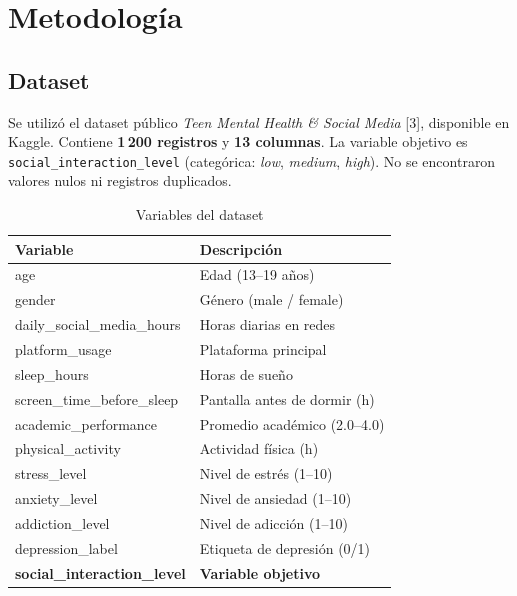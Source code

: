 \documentclass[11pt,twocolumn]{article}
\begin{document}
\section{Metodolog\'ia}

\subsection{Dataset}

Se utiliz\'o el dataset p\'ublico \textit{Teen Mental Health \& Social Media}
[3], disponible en Kaggle. Contiene \textbf{1\,200 registros} y
\textbf{13 columnas}. La variable objetivo es
\texttt{social\_interaction\_level} (categ\'orica: \textit{low},
\textit{medium}, \textit{high}). No se encontraron valores nulos ni
registros duplicados.

\begin{table}[H]
\centering
\caption{Variables del dataset}
\small
\begin{tabularx}{\linewidth}{lX}
\toprule
\textbf{Variable} & \textbf{Descripci\'on} \\
\midrule
\rowcolor{lightrow} age & Edad (13--19 a\~nos) \\
gender & G\'enero (male / female) \\
\rowcolor{lightrow} daily\_social\_media\_hours & Horas diarias en redes \\
platform\_usage & Plataforma principal \\
\rowcolor{lightrow} sleep\_hours & Horas de sue\~no \\
screen\_time\_before\_sleep & Pantalla antes de dormir (h) \\
\rowcolor{lightrow} academic\_performance & Promedio acad\'emico (2.0--4.0) \\
physical\_activity & Actividad f\'isica (h) \\
\rowcolor{lightrow} stress\_level & Nivel de estr\'es (1--10) \\
anxiety\_level & Nivel de ansiedad (1--10) \\
\rowcolor{lightrow} addiction\_level & Nivel de adicci\'on (1--10) \\
depression\_label & Etiqueta de depresi\'on (0/1) \\
\rowcolor{darkrow} \textbf{social\_interaction\_level} & \textbf{Variable objetivo} \\
\bottomrule
\end{tabularx}
\end{table}
\end{document}
